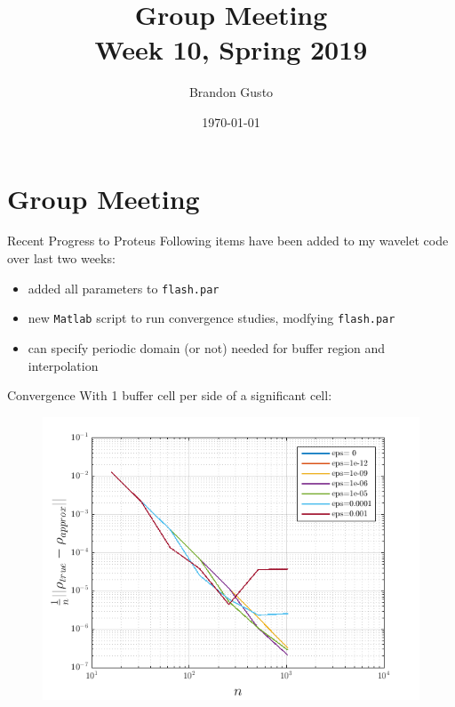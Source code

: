 \documentclass{beamer}
\newcommand{\weeknum}{10}
\begin{document}
\section{Group Meeting}
\title{Group Meeting \\ Week \weeknum, Spring 2019}
\author{Brandon Gusto} %
\date{\today}
\frame{\titlepage}

\begin{frame}{Recent Progress to Proteus}
  Following items have been added to my wavelet code over last two weeks:
  \begin{itemize}
    \item<2-> added all parameters to \texttt{flash.par}
    \item<3-> new \texttt{Matlab} script to run convergence studies, modfying \texttt{flash.par}
    \item<4-> can specify periodic domain (or not) needed for buffer region and interpolation
  \end{itemize}
\end{frame}

\begin{frame}{Convergence}
  With 1 buffer cell per side of a significant cell:
  \begin{figure}
    \center
    \includegraphics[scale=0.5]{buffer1.png}
  \end{figure}
\end{frame}
\end{document}
